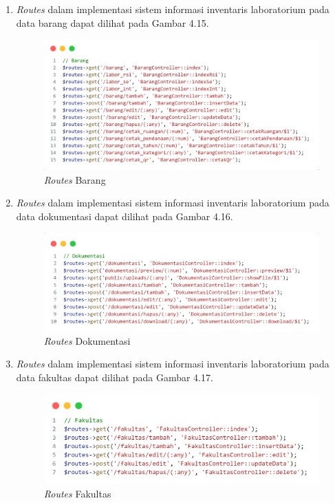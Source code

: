 \begin{enumerate}
  \item \textit{Routes} dalam implementasi sistem informasi inventaris laboratorium pada data barang dapat dilihat pada Gambar 4.15.

        \begin{figure}
          \centering
          \includegraphics[width=0.82\linewidth]{konten//gambar/routes barang.png}
          \caption{\textit{Routes} Barang}
          \label{fig:enter-label}
        \end{figure}

  \item \textit{Routes} dalam implementasi sistem informasi inventaris laboratorium pada data dokumentasi dapat dilihat pada Gambar 4.16.

        \begin{figure}
          \centering
          \includegraphics[width=0.82\linewidth]{konten//gambar/routes dokumentasi.png}
          \caption{\textit{Routes} Dokumentasi}
          \label{fig:enter-label}
        \end{figure}

  \item \textit{Routes} dalam implementasi sistem informasi inventaris laboratorium pada data fakultas dapat dilihat pada Gambar 4.17.

        \begin{figure}
          \centering
          \includegraphics[width=0.82\linewidth]{konten//gambar/routes fakultas.png}
          \caption{\textit{Routes} Fakultas}
          \label{fig:enter-label}
        \end{figure}


\end{enumerate}
